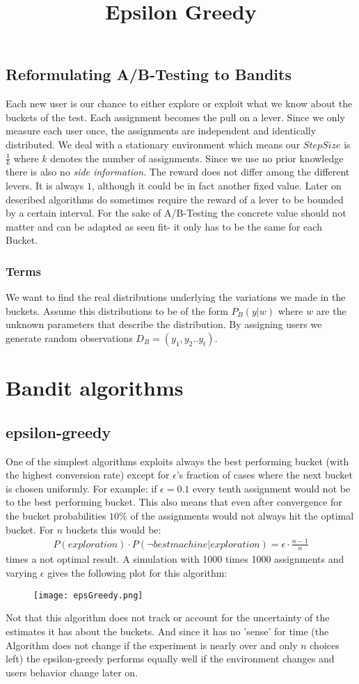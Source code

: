 \documentclass[main.tex]{subfiles}
\begin{document}
\subsection{Reformulating A/B-Testing to Bandits}
Each new user is our chance to either explore or exploit what we know about the buckets of the test. Each assignment becomes the pull on a lever. Since we only measure each user once, the assignments are independent and identically distributed. We deal with a stationary environment which means our $StepSize$ is $\frac{1}{k}$ where $k$ denotes the number of assignments. Since we use no prior knowledge there is also no \emph{side information}. The reward does not differ among the different levers. It is always $1$, although it could be in fact another fixed value. Later on described algorithms do sometimes require the reward of a lever to be bounded by a certain interval. For the sake of A/B-Testing the concrete value should not matter and can be adapted as seen fit- it only has to be the same for each Bucket. 
\subsubsection{Terms}
We want to find the real distributions underlying the variations we made in the buckets. Assume this distributions to be of the form $P_B(y|w)$ where $w$ are the unknown parameters that describe the distribution. By assigning users we generate random observations $D_B=(y_1,y_2..y_t)$.

\section{Bandit algorithms}
\subsection{epsilon-greedy}
One of the simplest algorithms exploits always the best performing bucket (with the highest conversion rate) except for $\epsilon $'s fraction of cases where the next bucket is chosen uniformly. For example: if $\epsilon = 0.1$ every tenth assignment would not be to the best performing bucket. This also means that even after convergence for the bucket probabilities $10\%$ of the assignments would not always hit the optimal bucket. For $n$ buckets this would be:
\begin{align*}
P(exploration) \cdot P(\neg best machine | exploration) = \epsilon \cdot \frac{n-1}{n}
\end{align*}
times a not optimal result. A simulation with 1000 times 1000 assignments and varying $\epsilon$ gives the following plot for this algorithm:
\begin{figure}[ht]
\texttt{[image: epsGreedy.png]}
\centering
\title{Epsilon Greedy}
\end{figure}
Not that this algorithm does not track or account for the uncertainty of the estimates it has about the buckets. And since it has no 'sense' for time (the Algorithm does not change if the experiment is nearly over and only $n$ choices left) the epsilon-greedy performs equally well if the environment changes and users behavior change later on.
\end{document}
